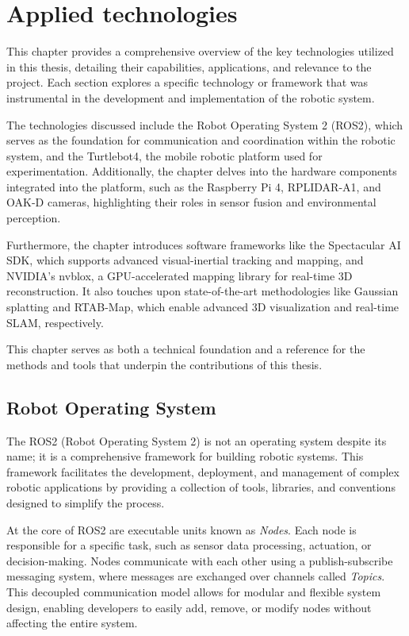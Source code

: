\chapter{Applied technologies} \label{related_works}

This chapter provides a comprehensive overview of the key technologies utilized in this thesis, detailing their capabilities, applications, and relevance to the project. Each section explores a specific technology or framework that was instrumental in the development and implementation of the robotic system.

The technologies discussed include the Robot Operating System 2 (ROS2), which serves as the foundation for communication and coordination within the robotic system, and the Turtlebot4, the mobile robotic platform used for experimentation. Additionally, the chapter delves into the hardware components integrated into the platform, such as the Raspberry Pi 4, RPLIDAR-A1, and OAK-D cameras, highlighting their roles in sensor fusion and environmental perception.

Furthermore, the chapter introduces software frameworks like the Spectacular AI SDK, which supports advanced visual-inertial tracking and mapping, and NVIDIA’s nvblox, a GPU-accelerated mapping library for real-time 3D reconstruction. It also touches upon state-of-the-art methodologies like Gaussian splatting and RTAB-Map, which enable advanced 3D visualization and real-time SLAM, respectively.

This chapter serves as both a technical foundation and a reference for the methods and tools that underpin the contributions of this thesis.

\section{Robot Operating System}

The ROS2 \cite{ROS2} (Robot Operating System 2) is not an operating system despite its name; it is a comprehensive framework for building robotic systems. This framework facilitates the development, deployment, and management of complex robotic applications by providing a collection of tools, libraries, and conventions designed to simplify the process.

At the core of ROS2 are executable units known as \textit{Nodes}. Each node is responsible for a specific task, such as sensor data processing, actuation, or decision-making. Nodes communicate with each other using a publish-subscribe messaging system, where messages are exchanged over channels called \textit{Topics}. This decoupled communication model allows for modular and flexible system design, enabling developers to easily add, remove, or modify nodes without affecting the entire system.

